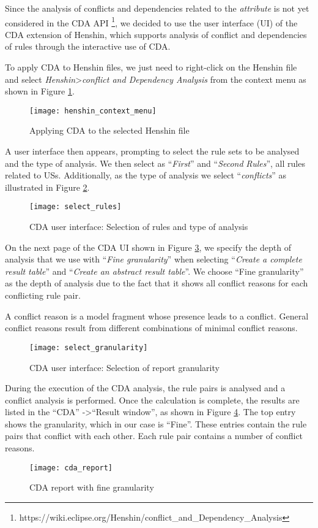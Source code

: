 Since the analysis of conflicts and dependencies related to the \textit{attribute} is not yet considered in the CDA API \footnote{https://wiki.eclipse.org/Henshin/conflict\_and\_Dependency\_Analysis}, we decided to use the user interface (UI) of the CDA extension of Henshin, which supports analysis of conflict and dependencies of rules through the interactive use of CDA.

To apply CDA to Henshin files, we just need to right-click on the Henshin file and select \textit{Henshin}\textgreater\textit{conflict and Dependency Analysis} from the context menu as shown in Figure \ref{fig:henshin_context_menu}.
\begin{figure}[h]
	\centering
	\texttt{[image: henshin\_context\_menu]}
	\caption{Applying CDA to the selected Henshin file}\label{fig:henshin_context_menu}
\end{figure}
A user interface then appears, prompting to select the rule sets to be analysed and the type of analysis. We then select as \enquote{\textit{First}} and \enquote{\textit{Second} \textit{Rules}}, all rules related to USs. Additionally, as the type of analysis we select \enquote{\textit{conflicts}} as illustrated in Figure \ref{fig:select_rules}.

\begin{figure}[h]
	\centering
	\texttt{[image: select\_rules]}
	\caption{CDA user interface: Selection of rules and type of analysis}\label{fig:select_rules}
\end{figure}

 On the next page of the CDA UI shown in Figure \ref{fig:select_granularity}, we specify the depth of analysis that we use with \enquote{\textit{Fine granularity}} when selecting \enquote{\textit{Create a complete result table}} and \enquote{\textit{Create an abstract result table}}. We choose \enquote{Fine granularity} as the depth of analysis due to the fact that it shows all conflict reasons for each conflicting rule pair.
 
 A conflict reason is a model fragment whose presence leads to a conflict. General conflict reasons result from different combinations of minimal conflict reasons\cite{cda_api}.
 \begin{figure}[h]
 	\centering
 	\texttt{[image: select\_granularity]}
 	\caption{CDA user interface: Selection of report granularity}\label{fig:select_granularity}
 \end{figure}
 
 During the execution of the CDA analysis, the rule pairs is analysed and a conflict analysis is performed. Once the calculation is complete, the results are listed in the \enquote{CDA} -\textgreater \enquote{Result window}, as shown in Figure \ref{fig:cda_report}. The top entry shows the granularity, which in our case is \enquote{Fine}. These entries contain the rule pairs that conflict with each other. Each rule pair contains a number of conflict reasons.
  \begin{figure}[h]
 	\centering
 	\texttt{[image: cda\_report]}
 	\caption{CDA report with fine granularity}\label{fig:cda_report}
 \end{figure}
 
